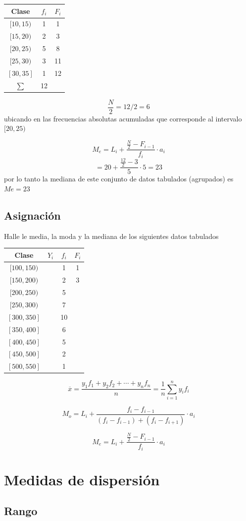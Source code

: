 \documentclass[10pt,]{krantz}
\theoremstyle{definition}
\theoremstyle{definition}
\theoremstyle{definition}
\theoremstyle{definition}
\theoremstyle{remark}
\begin{document}
\begin{longtable}[]{@{}ccc@{}}
\toprule
Clase & \(f_i\) & \(F_i\)\tabularnewline
\midrule
\endhead
\([10,15)\) & 1 & 1\tabularnewline
\([15,20)\) & 2 & 3\tabularnewline
\([20,25)\) & 5 & 8\tabularnewline
\([25,30)\) & 3 & 11\tabularnewline
\([30,35]\) & 1 & 12\tabularnewline
\(\sum\) & 12 &\tabularnewline
\bottomrule
\end{longtable}

\[\frac{N}{2}=12/2=6\] ubicando en las frecuencias absolutas acumuladas que corresponde al intervalo \([20,25)\)

\[  M_e=L_{i}+\frac{\frac{N}{2}-F_{i-1}}{f_{i}}\cdot a_{i}\]
\[  =20+\frac{\frac{12}{2}-3}{5}\cdot 5=23\] por lo tanto la mediana de este conjunto de datos tabulados (agrupados) es \(Me=23\)

\hypertarget{asignaciuxf3n-1}{%
\section{Asignación}\label{asignaciuxf3n-1}}

Halle le media, la moda y la mediana de los siguientes datos tabulados

\begin{longtable}[]{@{}cccc@{}}
\toprule
Clase & \(Y_i\) & \(f_i\) & \(F_i\)\tabularnewline
\midrule
\endhead
\([100,150)\) & & 1 & 1\tabularnewline
\([150,200)\) & & 2 & 3\tabularnewline
\([200,250)\) & & 5 &\tabularnewline
\([250,300)\) & & 7 &\tabularnewline
\([300,350]\) & & 10 &\tabularnewline
\([350,400]\) & & 6 &\tabularnewline
\([400,450]\) & & 5 &\tabularnewline
\([450,500]\) & & 2 &\tabularnewline
\([500,550]\) & & 1 &\tabularnewline
\bottomrule
\end{longtable}

\[\overline{x}=\frac{y_1f_1+y_2f_2+\cdots+y_nf_n}{n}=\frac{1}{n}\sum_{i=1}^ny_if_i\]

\[ M_o=L_i+\frac{f_i-f_{i-1}}{(f_i-f_{i-1})+(f_i-f_{i+1})}\cdot a_i\]

\[  M_e=L_{i}+\frac{\frac{N}{2}-F_{i-1}}{f_{i}}\cdot a_{i}\]

\hypertarget{medidas-de-dispersiuxf3n}{%
\chapter{Medidas de dispersión}\label{medidas-de-dispersiuxf3n}}

\hypertarget{rango}{%
\section{Rango}\label{rango}}
\end{document}
